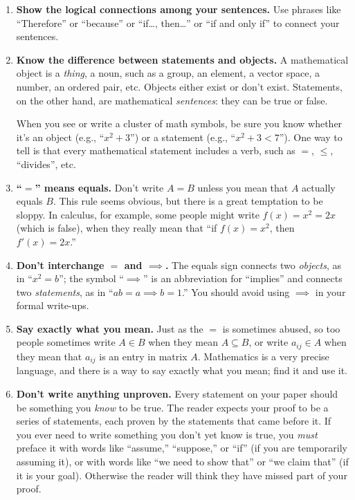 \begin{enumerate}
\item \textbf{Show the logical connections among your sentences.}
	Use phrases like ``Therefore'' or ``because'' or ``if\ldots, then\ldots''
	or ``if and only if'' to connect your sentences.
  
\item \textbf{Know the difference between statements and objects.}
	A mathematical object is a \emph{thing}, a noun,
	such as a group, an element, a vector space, a number, an ordered pair, etc.
	Objects either exist or don't exist.
	Statements, on the other hand, are mathematical \emph{sentences}:  they can be true or false.
	
	When you see or write a cluster of math symbols, be sure you know 
	whether it's an object (e.g., ``$x^2+3$'') or a statement (e.g., ``$x^2+3<7$'').
	One way to tell is that every mathematical statement includes a verb, such as
	$=$, $\leq$, ``divides'', etc.
	
\item \textbf{``$=$'' means equals.}
	Don't write $A=B$ unless you mean that $A$ actually equals $B$.
	This rule seems obvious,
	but there is a great temptation to be sloppy.  In calculus, for example, some people might write $f(x)=x^{2}=2x$ (which is false), when they really mean that ``if $f(x)=x^{2}$, then $f'(x)=2x$.''

\item \textbf{Don't interchange ${=}$ and ${\implies}$.}
	The equals sign connects two \emph{objects}, as in ``$x^2=b$''; 
	the symbol ``$\implies$'' is an abbreviation for ``implies'' and connects two \emph{statements},
	as in ``$ab=a \implies b=1$.''  You should avoid using $\implies$ in your formal write-ups.

\item \textbf{Say exactly what you mean.}
	Just as the $=$ is sometimes abused,
	so too people sometimes write $A\in B$ when they mean $A\subseteq B$,
	or write $a_{ij}\in A$ when they mean that $a_{ij}$ is an entry in matrix $A$.
	Mathematics is a very precise language, and there is a way to say exactly what you mean;
	find it and use it.

\item \textbf{Don't write anything unproven.}
	Every statement on your paper should be something you \emph{know} to be true.
	The reader expects your proof to be a series of statements, each proven by the statements that came before it.
	If you ever need to write something you don't yet know is true,
	you \emph{must} preface it with words like ``assume,'' ``suppose,'' or ``if''
	(if you are temporarily assuming it),
	or with words like ``we need to show that'' or ``we claim that'' (if it is your goal).
	Otherwise the reader will think they have missed part of your proof.


\end{enumerate}
